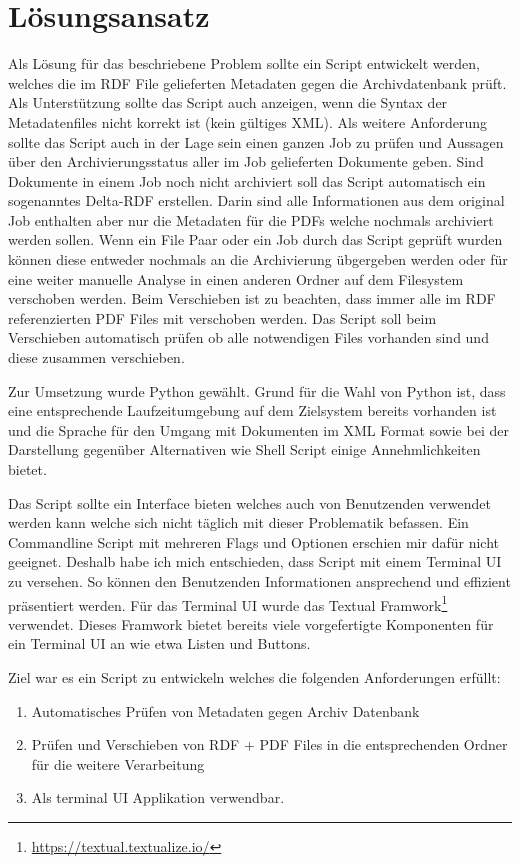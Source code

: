 \documentclass[a4paper,oneside, 12pt]{report}
\begin{document}
\section{Lösungsansatz}
Als Lösung für das beschriebene Problem sollte ein Script entwickelt werden, welches die im \ac{RDF} File gelieferten Metadaten gegen die Archivdatenbank prüft. Als Unterstützung sollte das Script auch anzeigen, wenn die Syntax der Metadatenfiles nicht korrekt ist (kein gültiges XML). Als weitere Anforderung sollte das Script auch in der Lage sein einen ganzen Job zu prüfen und Aussagen über den Archivierungsstatus aller im Job gelieferten Dokumente geben. Sind Dokumente in einem Job noch nicht archiviert soll das Script automatisch ein sogenanntes Delta-RDF erstellen. Darin sind alle Informationen aus dem original Job enthalten aber nur die Metadaten für die PDFs welche nochmals archiviert werden sollen.
Wenn ein File Paar oder ein Job durch das Script geprüft wurden können diese entweder nochmals an die Archivierung übgergeben werden oder für eine weiter manuelle Analyse in einen anderen Ordner auf dem Filesystem verschoben werden. Beim Verschieben ist zu beachten, dass immer alle im RDF referenzierten PDF Files mit verschoben werden. Das Script soll beim Verschieben automatisch prüfen ob alle notwendigen Files vorhanden sind und diese zusammen verschieben.

Zur Umsetzung wurde Python gewählt. Grund für die Wahl von Python ist, dass eine entsprechende Laufzeitumgebung auf dem Zielsystem bereits vorhanden ist und die Sprache für den Umgang mit Dokumenten im XML Format sowie bei der Darstellung gegenüber Alternativen wie Shell Script einige Annehmlichkeiten bietet.

Das Script sollte ein Interface bieten welches auch von Benutzenden verwendet werden kann welche sich nicht täglich mit dieser Problematik befassen. Ein Commandline Script mit mehreren Flags und Optionen erschien mir dafür nicht geeignet. Deshalb habe ich mich entschieden, dass Script mit einem Terminal UI zu versehen. So können den Benutzenden Informationen ansprechend und effizient präsentiert werden. Für das Terminal UI wurde das Textual Framwork\footnote{\url{https://textual.textualize.io/}}  verwendet. Dieses Framwork bietet bereits viele vorgefertigte Komponenten für ein Terminal UI an wie etwa Listen und Buttons.

Ziel war es ein Script zu entwickeln welches die folgenden Anforderungen erfüllt:

\begin{enumerate}
  \item Automatisches Prüfen von Metadaten gegen Archiv Datenbank
  \item Prüfen und Verschieben von RDF + PDF Files in die entsprechenden Ordner für die weitere Verarbeitung
  \item Als terminal UI Applikation verwendbar.
\end{enumerate}
\end{document}
